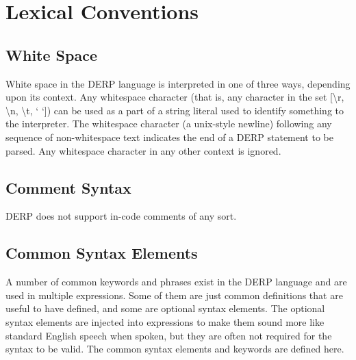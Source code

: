 \section{Lexical Conventions}

\subsection{White Space}
White space in the DERP language is interpreted in one of three ways, 
depending upon its context. Any whitespace character (that is, any 
character in the set [\textbackslash r, \textbackslash n, \textbackslash t, ‘ ‘]) can be used as a part of a 
string literal used to identify something to the interpreter. 
The whitespace character \n (a unix-style newline) following any sequence 
of non-whitespace text indicates the end of a DERP statement to be parsed. 
Any whitespace character in any other context is ignored.


\subsection{Comment Syntax}
DERP does not support in-code comments of any sort.

\subsection{Common Syntax Elements}
A number of common keywords and phrases exist in the DERP language and are 
used in multiple expressions. Some of them are just common definitions that 
are useful to have defined, and some are optional syntax elements. 
The optional syntax elements are injected into expressions to make them 
sound more like standard English speech when spoken, but they are often not 
required for the syntax to be valid. The common syntax elements and keywords 
are defined here.

